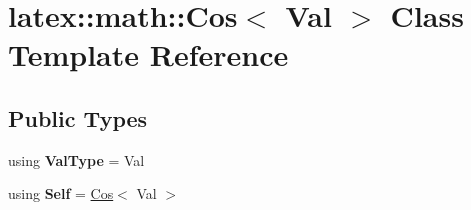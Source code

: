 \hypertarget{classlatex_1_1math_1_1Cos}{\section{latex\-:\-:math\-:\-:Cos$<$ Val $>$ Class Template Reference}
\label{classlatex_1_1math_1_1Cos}
}
\subsection*{Public Types}
\begin{DoxyCompactItemize}
\item 
\hypertarget{classlatex_1_1math_1_1Cos_a154c39b3e1e020d6e6c9b220946a9203}{using {\bfseries Val\-Type} = Val}\label{classlatex_1_1math_1_1Cos_a154c39b3e1e020d6e6c9b220946a9203}

\item 
\hypertarget{classlatex_1_1math_1_1Cos_a2905a73f1686f7b2e111805fe9e53a8a}{using {\bfseries Self} = \hyperlink{classlatex_1_1math_1_1Cos}{Cos}$<$ Val $>$}\label{classlatex_1_1math_1_1Cos_a2905a73f1686f7b2e111805fe9e53a8a}

\end{DoxyCompactItemize}

